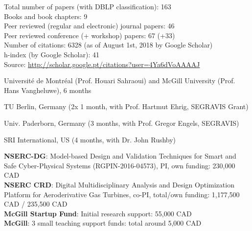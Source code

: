 \documentclass{xetexCV}
\begin{document}
Total number of papers (with DBLP classification): 163 \\
Books and book chapters: 9 \\
Peer reviewed (regular and electronic) journal papers: 46 \\
Peer reviewed conference (+ workshop) papers: 67 (+33)  \\
Number of citations: 6328 (as of August 1st, 2018 by Google Scholar) \\
h-index (by Google Scholar): 41 \\
Source: \url{http://scholar.google.pt/citations?user=4Ya6dVoAAAAJ} 

Universit\'e de Montr\'eal  (Prof. Houari Sahraoui) and McGill University (Prof. Hans Vangheluwe),  6 months


TU Berlin, Germany (2x 1 month, with Prof. Hartmut Ehrig, SEGRAVIS Grant)

Univ. Paderborn, Germany  (3 months, with Prof. Gregor Engels,
SEGRAVIS) \

SRI International, US (4 months, with Dr. John Rushby)  




\textbf{NSERC-DG}:  Model-based Design and Validation Techniques for
Smart and Safe Cyber-Physical Systems (RGPIN-2016-04573), PI, own funding: 230,000 CAD \\
\textbf{NSERC CRD}:  Digital Multidisciplinary Analysis and Design Optimization Platform for Aeroderivative Gas Turbines, co-PI, total/own funding: 1,177,500 CAD / 235,500 CAD \\
\textbf{McGill Startup Fund}:  Initial research support: 55,000 CAD \\
\textbf{McGill}:  3 small teaching support funds: total around 5,000 CAD \\
\end{document}

